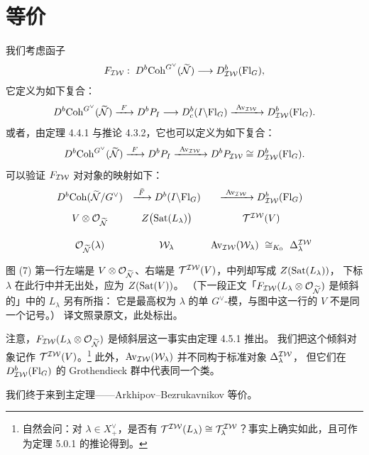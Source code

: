 \section{等价}\label{sec:equiv}

我们考虑函子
\[
F_{\mathcal{IW}}:\;D^b\mathrm{Coh}^{G^\vee}(\widetilde{\mathcal{N}})\longrightarrow D^b_{\mathcal{IW}}(\mathrm{Fl}_G),
\]
它定义为如下复合：
\[
D^b\Coh^{G^\vee}(\tN)\xrightarrow{\ F\ }D^bP_I
\longrightarrow D^b_c(I\backslash\Fl_G)\xrightarrow{\ \AvIW\ }D^b_{\IW}(\Fl_G).
\]
或者，由定理 4.4.1 与推论 4.3.2，它也可以定义为如下复合：
\[
D^b\mathrm{Coh}^{G^\vee}(\widetilde{\mathcal{N}})\xrightarrow{\ F\ }D^bP_I
\xrightarrow{\ \mathrm{Av}_{\mathcal{IW}}\ }D^bP_{\mathcal{IW}}\cong D^b_{\mathcal{IW}}(\mathrm{Fl}_G).
\]
可以验证 $F_{\mathcal{IW}}$ 对对象的映射如下：
\begin{equation}
\begin{array}{ccc}
D^b\mathrm{Coh}(\widetilde{\mathcal{N}}/G^\vee) & \xrightarrow{\ \bar F\ } D^b(I\backslash\mathrm{Fl}_G) & \xrightarrow{\ \mathrm{Av}_{\mathcal{IW}}\ } D^b_{\mathcal{IW}}(\mathrm{Fl}_G)\\[0.9em]
V\otimes\mathcal{O}_{\widetilde{\mathcal{N}}} & Z\bigl(\mathrm{Sat}(L_\lambda)\bigr) & \mathcal{T}^{\mathcal{IW}}(V)\\[1.5em]
\mathcal{O}_{\widetilde{\mathcal{N}}}(\lambda) & \mathcal{W}_\lambda
  & \mathrm{Av}_{\mathcal{IW}}(\mathcal{W}_\lambda)\ \cong_{K_0}\ \Delta^{\mathcal{IW}}_\lambda
\end{array}
\end{equation}

\begin{yizhu}
图 (7) 第一行左端是 $V\otimes\mathcal{O}_{\widetilde{\mathcal{N}}}$、右端是 $\mathcal{T}^{\mathcal{IW}}(V)$，中列却写成 $Z(\mathrm{Sat}(L_\lambda))$，
下标 $\lambda$ 在此行中并无出处，应为 $Z(\mathrm{Sat}(V))$。
（下一段正文「$F_{\mathcal{IW}}(L_\lambda\otimes\mathcal{O}_{\widetilde{\mathcal{N}}})$ 是倾斜的」中的 $L_\lambda$ 另有所指：
它是最高权为 $\lambda$ 的单 $G^\vee$-模，与图中这一行的 $V$ 不是同一个记号。）
译文照录原文，此处标出。
\end{yizhu}

注意，$F_{\mathcal{IW}}(L_\lambda\otimes\mathcal{O}_{\widetilde{\mathcal{N}}})$ 是倾斜层这一事实由定理 4.5.1 推出。
我们把这个倾斜对象记作 $\mathcal{T}^{\mathcal{IW}}(V)$。\footnote{自然会问：对 $\lambda\in X^\vee_+$，是否有 $\mathcal{T}^{\mathcal{IW}}(L_\lambda)\cong\mathcal{T}^{\mathcal{IW}}_\lambda$？事实上确实如此，且可作为定理 5.0.1 的推论得到。}
此外，$\mathrm{Av}_{\mathcal{IW}}(\mathcal{W}_\lambda)$ 并不同构于标准对象 $\Delta^{\mathcal{IW}}_\lambda$，
但它们在 $D^b_{\mathcal{IW}}(\mathrm{Fl}_G)$ 的 Grothendieck 群中代表同一个类。

我们终于来到主定理——Arkhipov–Bezrukavnikov 等价。

